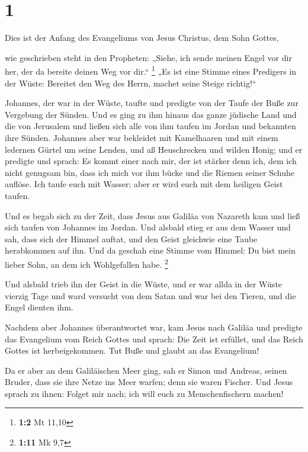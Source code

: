 \hypertarget{section}{%
\section{1}\label{section}}

 Dies ist der Anfang des Evangeliums von Jesus Christus, dem
Sohn Gottes,

 wie geschrieben steht in den Propheten: „Siehe, ich sende
meinen Engel vor dir her, der da bereite deinen Weg vor dir.``
\footnote{\textbf{1:2} Mt 11,10}  „Es ist eine Stimme eines
Predigers in der Wüste: Bereitet den Weg des Herrn, machet seine Steige
richtig!{}``

 Johannes, der war in der Wüste, taufte und predigte von der
Taufe der Buße zur Vergebung der Sünden.  Und es ging zu ihm
hinaus das ganze jüdische Land und die von Jerusalem und ließen sich
alle von ihm taufen im Jordan und bekannten ihre Sünden. 
Johannes aber war bekleidet mit Kamelhaaren und mit einem ledernen
Gürtel um seine Lenden, und aß Heuschrecken und wilden Honig;
 und er predigte und sprach: Es kommt einer nach mir, der
ist stärker denn ich, dem ich nicht genugsam bin, dass ich mich vor ihm
bücke und die Riemen seiner Schuhe auflöse.  Ich taufe euch
mit Wasser; aber er wird euch mit dem heiligen Geist taufen.

 Und es begab sich zu der Zeit, dass Jesus aus Galiläa von
Nazareth kam und ließ sich taufen von Johannes im Jordan. 
Und alsbald stieg er aus dem Wasser und sah, dass sich der Himmel
auftat, und den Geist gleichwie eine Taube herabkommen auf ihn.
 Und da geschah eine Stimme vom Himmel: Du bist mein lieber
Sohn, an dem ich Wohlgefallen habe. \footnote{\textbf{1:11} Mk 9,7}

 Und alsbald trieb ihn der Geist in die Wüste,
 und er war allda in der Wüste vierzig Tage und ward
versucht von dem Satan und war bei den Tieren, und die Engel dienten
ihm.

 Nachdem aber Johannes überantwortet war, kam Jesus nach
Galiläa und predigte das Evangelium vom Reich Gottes  und
sprach: Die Zeit ist erfüllet, und das Reich Gottes ist herbeigekommen.
Tut Buße und glaubt an das Evangelium!

 Da er aber an dem Galiläischen Meer ging, sah er Simon und
Andreas, seinen Bruder, dass sie ihre Netze ins Meer warfen; denn sie
waren Fischer.  Und Jesus sprach zu ihnen: Folget mir nach;
ich will euch zu Menschenfischern machen!


